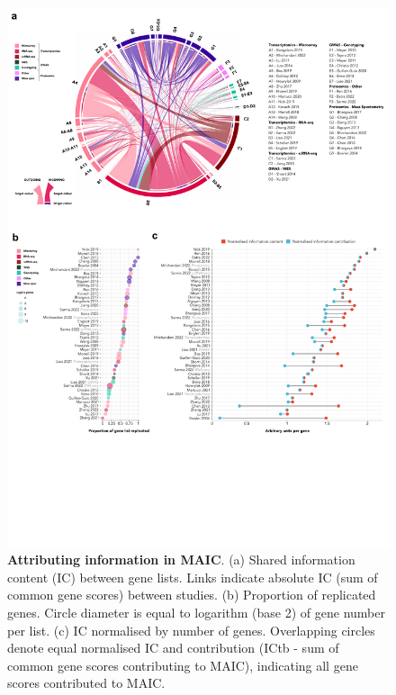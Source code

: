 \documentclass[
  11,
  a4paper,
]{article}
\begin{document}
\begin{figure}

{\centering \includegraphics{../img/Supplementary_Figure_2.png}

}

\caption{\textbf{Attributing information in MAIC}. (a) Shared
information content (IC) between gene lists. Links indicate absolute IC
(sum of common gene scores) between studies. (b) Proportion of
replicated genes. Circle diameter is equal to logarithm (base 2) of gene
number per list. (c) IC normalised by number of genes. Overlapping
circles denote equal normalised IC and contribution (ICtb - sum of
common gene scores contributing to MAIC), indicating all gene scores
contributed to MAIC.}

\end{figure}
\end{document}
